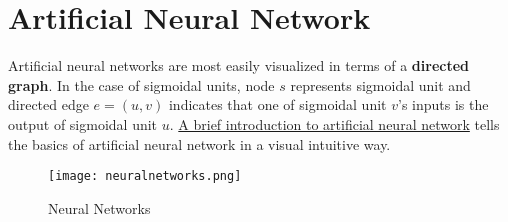 \documentclass[titlestyle=hang,11pt]{elegantbook}
\begin{document}
%
%
%
%

\chapter{Artificial Neural Network}

Artificial neural networks are most easily visualized in terms of a \textbf{directed graph}. 
In the case of sigmoidal units, node $s$ represents sigmoidal unit  and directed edge $e=(u,v)$ indicates that one of sigmoidal unit $v$'s inputs is the output of sigmoidal unit $u$.
\href{https://brilliant.org/wiki/artificial-neural-network/}{A brief introduction to artificial neural network} tells the basics of artificial neural network in a visual intuitive way.


\clearpage
\begin{figure}[!htbp]
	\centering
	\texttt{[image: neuralnetworks.png]}
	\caption{Neural Networks\label{fig:nn}}
\end{figure}
\end{document}
